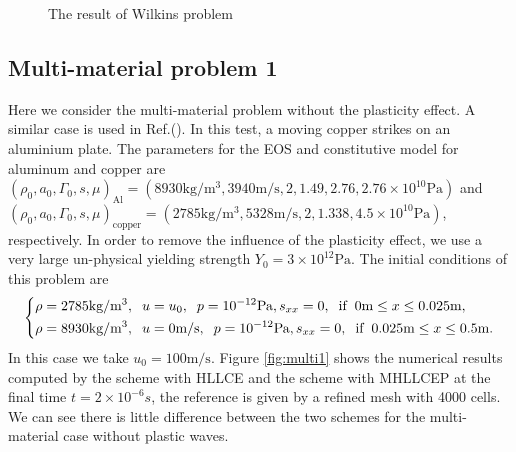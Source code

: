 \documentclass[review]{elsarticle}
\begin{document}
\begin{figure}
      \caption{ The result of Wilkins problem}
      \label{fig:Wilkins1}
    \end{figure}

    \subsection{Multi-material problem 1}\label{pro:multi1}
  Here we consider the multi-material problem without the plasticity effect. A similar case is used in Ref.(\cite{ghaisas2016high}). In this test, a moving  copper strikes on an aluminium plate. The parameters for the EOS and constitutive model for aluminum and copper  are
$ (\rho_0, a_0, \Gamma_0, s, \mu)_{\text{Al}} =(8930 \text{kg}/\text{m}^3, 3940 \text{m}/\text{s},2, 1.49, 2.76 ,2.76\times 10^{10} \text{Pa} )$ and   $(\rho_0, a_0, \Gamma_0, s, \mu)_{\text{copper}} =(2785 \text{kg}/\text{m}^3, 5328 \text{m}/\text{s},2, 1.338,4.5\times 10^{10}\text{Pa})$, respectively. In order to remove the influence of the plasticity effect, we use a very large un-physical yielding strength $Y_0 = 3\times 10^{12} \text{Pa}$.  The initial conditions of this problem are
\begin{equation}\label{eq:initmulti}
  \left\{ \begin{aligned}
    & \rho = 2785 \text{kg}/\text{m}^3, \hspace{0.2cm} u = u_0, \hspace{0.2cm} p = 10^{-12}\text{Pa}, s_{xx} = 0, \hspace{0.2cm} \text{if} \hspace{0.2cm} 0\text{m} \le x \le 0.025 \text{m},\\
    &  \rho = 8930 \text{kg}/\text{m}^3, \hspace{0.2cm} u = 0\text{m}/\text{s}, \hspace{0.2cm} p = 10^{-12}\text{Pa}, s_{xx} = 0, \hspace{0.2cm} \text{if} \hspace{0.2cm} 0.025\text{m} \le x \le 0.5 \text{m}.\\
    \end{aligned}
  \right.
\end{equation}
In this case we take $u_0 = 100 \text{m}/\text{s}$. Figure \ref{fig:multi1}  shows  the numerical results computed by the scheme with HLLCE and the scheme with MHLLCEP at the final time $ t= 2 \times 10^{-6}s$, the reference is given by a refined mesh  with 4000 cells.  We can see there is little difference between the two schemes  for  the multi-material case without plastic waves.
\end{document}
